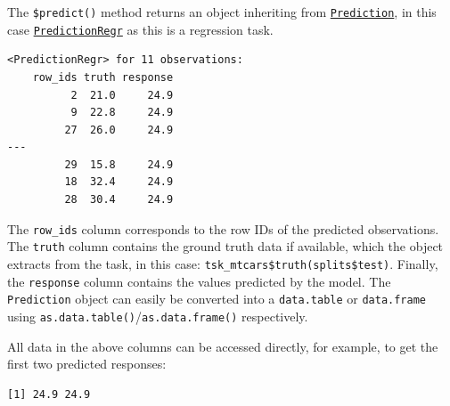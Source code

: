 The \texttt{\$predict()} method returns an object inheriting from
\href{https://mlr3.mlr-org.com/reference/Prediction.html}{\texttt{Prediction}},
in this case
\href{https://mlr3.mlr-org.com/reference/PredictionRegr.html}{\texttt{PredictionRegr}}
as this is a regression task.

\begin{Shaded}
\begin{Highlighting}[]
\end{Highlighting}
\end{Shaded}

\begin{verbatim}
<PredictionRegr> for 11 observations:
    row_ids truth response
          2  21.0     24.9
          9  22.8     24.9
         27  26.0     24.9
---                       
         29  15.8     24.9
         18  32.4     24.9
         28  30.4     24.9
\end{verbatim}

The \texttt{row\_ids} column corresponds to the row IDs of the predicted
observations. The \texttt{truth} column contains the ground truth data
if available, which the object extracts from the task, in this case:
\texttt{tsk\_mtcars\$truth(splits\$test)}. Finally, the
\texttt{response} column contains the values predicted by the model. The
\texttt{Prediction} object can easily be converted into a
\texttt{data.table} or \texttt{data.frame} using
\texttt{as.data.table()}/\texttt{as.data.frame()} respectively.

All data in the above columns can be accessed directly, for example, to
get the first two predicted responses:

\begin{Shaded}
\begin{Highlighting}[]
\SpecialCharTok{$}\NormalTok{response[}\SpecialCharTok{:}\NormalTok{]}
\end{Highlighting}
\end{Shaded}

\begin{verbatim}
[1] 24.9 24.9
\end{verbatim}

